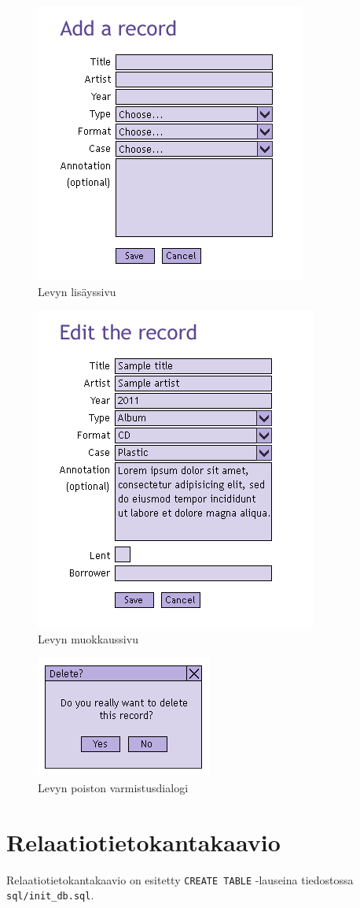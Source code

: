 \documentclass[a4paper,12pt]{report}
\begin{document}
\begin{figure}[H]
  \begin{center}
    \includegraphics[]{uidraft/addpage}
  \end{center}
  \caption{Levyn lisäyssivu}
\end{figure}

\begin{figure}[H]
  \begin{center}
    \includegraphics[]{uidraft/editpage}
  \end{center}
  \caption{Levyn muokkaussivu}
\end{figure}

\begin{figure}[H]
  \begin{center}
    \includegraphics[]{uidraft/delete}
  \end{center}
  \caption{Levyn poiston varmistusdialogi}
\end{figure}

\section{Relaatiotietokantakaavio}

Relaatiotietokantakaavio on esitetty \texttt{CREATE TABLE} -lauseina
tiedostossa \texttt{sql/init\_db.sql}.
\end{document}
